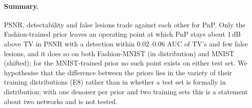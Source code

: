 \paragraph{Summary.} PSNR, detectability and false lesions trade against each other for PnP. Only the Fashion-trained prior leaves an operating point at which PnP stays about
$1$\,dB above TV in PSNR with a detection within $0.02$--$0.06$ AUC of TV's and few false lesions, and it does so on both Fashion-MNIST (in distribution) and MNIST (shifted); for the MNIST-trained prior no such point exists on either test set.
We hypothesise that the difference between the priors lies in the variety of their training distributions (E8) rather than in whether a test set is formally in distribution; with one denoiser per prior and two training sets this is a statement about two networks and is not tested.

